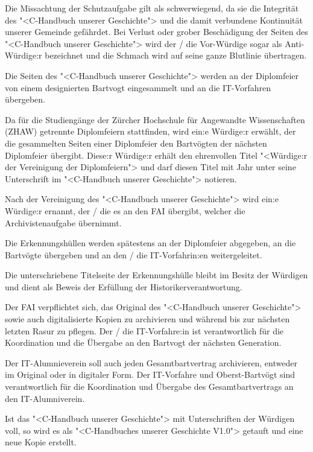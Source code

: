 \documentclass[fontsize=12pt,parskip=half]{scrartcl}
\begin{document}
\begin{contract}
  \Clause[title={Anti-Würdige}]
  Die Missachtung der Schutzaufgabe  gilt als schwerwiegend, da sie die Integrität des "<C-Handbuch unserer Geschichte"> und die
  damit verbundene Kontinuität unserer Gemeinde gefährdet. Bei Verlust oder grober Beschädigung der Seiten des "<C-Handbuch unserer Geschichte"> wird der / die Vor-Würdige sogar als
  Anti-Würdige:r bezeichnet und die Schmach wird auf seine ganze Blutlinie übertragen.

  \Clause[title={Einsammlung}]\label{H.einsammlung}
  Die Seiten des "<C-Handbuch unserer Geschichte"> werden an der Diplomfeier von einem designierten Bartvogt eingesammelt und an die IT-Vorfahren übergeben.

  Da für die Studiengänge der Zürcher Hochschule für Angewandte Wissenschaften (ZHAW) getrennte Diplomfeiern stattfinden, wird ein:e Würdige:r erwählt, der die gesammelten
  Seiten einer Diplomfeier den Bartvögten der nächsten Diplomfeier übergibt. Diese:r Würdige:r erhält den ehrenvollen Titel "<Würdige:r der Vereinigung der Diplomfeiern"> und darf
  diesen Titel mit Jahr unter seine Unterschrift im "<C-Handbuch unserer Geschichte"> notieren.

  Nach der Vereinigung des "<C-Handbuch unserer Geschichte"> wird ein:e Würdige:r ernannt, der / die es an den FAI übergibt, welcher die Archivistenaufgabe  übernimmt.

  Die Erkennungshüllen werden spätestens an der Diplomfeier abgegeben, an die Bartvögte übergeben und an den / die IT-Vorfahrin:en weitergeleitet.

  Die unterschriebene Titelseite der Erkennungshülle bleibt im Besitz der Würdigen und dient als Beweis der Erfüllung der Historikerverantwortung.

  \Clause[title={Archivistenaufgabe}]\label{H.archivistenaufgabe}
  Der FAI verpflichtet sich, das Original des "<C-Handbuch unserer Geschichte"> sowie auch digitalisierte Kopien zu archivieren und während bis zur nächsten letzten Rasur
  zu pflegen. Der / die IT-Vorfahre:in ist verantwortlich für die Koordination und die Übergabe an den Bartvogt der nächsten Generation.

  Der IT-Alumnieverein soll auch jeden Gesamtbartvertrag archivieren, entweder im Original oder in digitaler Form. Der IT-Vorfahre und Oberst-Bartvögt sind verantwortlich für die Koordination
  und Übergabe des Gesamtbartvertrags an den IT-Alumniverein.

  Ist das "<C-Handbuch unserer Geschichte"> mit Unterschriften der Würdigen voll, so wird es als "<C-Handbuches unserer Geschichte V1.0"> getauft und eine neue Kopie erstellt.


\end{contract}
\end{document}
